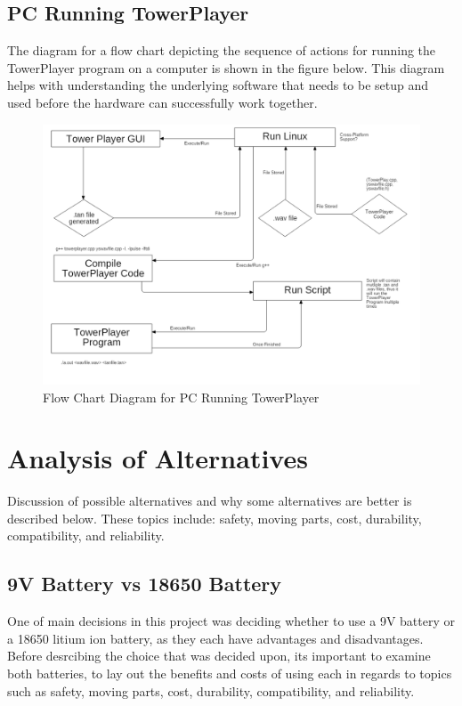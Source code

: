 \documentclass[12pt]{article}
\begin{document}
{{{{{	\subsection{PC Running TowerPlayer}
	The diagram for a flow chart depicting the sequence of actions for running the TowerPlayer program on a computer is shown in the figure below. This diagram helps with understanding the underlying software that needs to be setup and used before the hardware can successfully work together.
	
		\begin{figure}[ht!]
			\centering
			\includegraphics[width=170mm]{assets/PCRunningTowerPlayerFlowChartDiagram.png}
			\caption{Flow Chart Diagram for PC Running TowerPlayer \label{overflow}}
		\end{figure}

	\clearpage

\section{Analysis of Alternatives}
	Discussion of possible alternatives and why some alternatives are better is described below. These topics include: safety, moving parts, cost, durability, compatibility, and reliability.
	
	\subsection{9V Battery vs 18650 Battery}
	One of main decisions in this project was deciding whether to use a 9V battery or a 18650 litium ion battery, as they each have advantages and disadvantages. Before desrcibing the choice that was decided upon, its important to examine both batteries, to lay out the benefits and costs of using each in regards to topics such as safety, moving parts, cost, durability, compatibility, and reliability.\\
	
}}}}}
\end{document}

